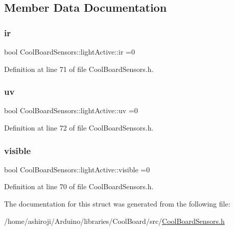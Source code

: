 \subsection{Member Data Documentation}
\mbox{\label{struct_cool_board_sensors_1_1light_active_a4c21258d3c89c6292740d6deb10f9dcc}} 
\subsubsection{\texorpdfstring{ir}{ir}}
{\footnotesize\ttfamily bool Cool\+Board\+Sensors\+::light\+Active\+::ir =0}



Definition at line 71 of file Cool\+Board\+Sensors.\+h.

\mbox{\label{struct_cool_board_sensors_1_1light_active_a0e6cfc311425a31f32c32fc3b834ffb8}} 
\subsubsection{\texorpdfstring{uv}{uv}}
{\footnotesize\ttfamily bool Cool\+Board\+Sensors\+::light\+Active\+::uv =0}



Definition at line 72 of file Cool\+Board\+Sensors.\+h.

\mbox{\label{struct_cool_board_sensors_1_1light_active_a9c351100969d0dc055ad2e6712cc7ac8}} 
\subsubsection{\texorpdfstring{visible}{visible}}
{\footnotesize\ttfamily bool Cool\+Board\+Sensors\+::light\+Active\+::visible =0}



Definition at line 70 of file Cool\+Board\+Sensors.\+h.



The documentation for this struct was generated from the following file\+:\begin{DoxyCompactItemize}
\item 
/home/ashiroji/\+Arduino/libraries/\+Cool\+Board/src/\hyperlink{_cool_board_sensors_8h}{Cool\+Board\+Sensors.\+h}\end{DoxyCompactItemize}
